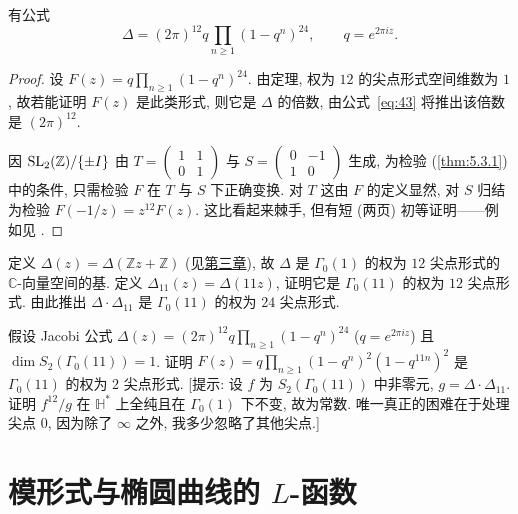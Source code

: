 \begin{theorem}[Jacobi] \label{thm:5.3.7} 
有公式
\[
\Delta = (2\pi)^{12}q\prod_{n\ge 1}(1-q^n)^{24}, \qquad q = e^{2\pi iz}.
\]
\end{theorem}

\begin{proof}
设 $F(z) = q\prod_{n\ge 1}(1-q^n)^{24}$. 由定理, 权为 $12$ 的尖点形式空间维数为 $1$, 故若能证明 $F(z)$ 是此类形式, 则它是 $\Delta$ 的倍数, 由公式~\eqref{eq:43} 将推出该倍数是 $(2\pi)^{12}$.

因 $\operatorname{SL}_2(\mathbb{Z})/\{\pm I\}$ 由 $T = \begin{pmatrix}1 & 1\\ 0 & 1\end{pmatrix}$ 与 $S = \begin{pmatrix}0 & -1\\ 1 & 0\end{pmatrix}$ 生成, 为检验 (\ref{thm:5.3.1}) 中的条件, 只需检验 $F$ 在 $T$ 与 $S$ 下正确变换. 对 $T$ 这由 $F$ 的定义显然, 对 $S$ 归结为检验 $F(-1/z) = z^{12}F(z)$. 这比看起来棘手, 但有短 (两页) 初等证明——例如见 \cite[VII, 4.4]{serre1973}.
\end{proof}

\begin{exercise} \label{thm:5.3.8} 
定义 $\Delta(z) = \Delta(\mathbb{Z}z + \mathbb{Z})$ (见\hyperref[ch:3]{第三章}), 故 $\Delta$ 是 $\Gamma_0(1)$ 的权为 $12$ 尖点形式的 $\mathbb{C}$-向量空间的基. 定义 $\Delta_{11}(z) = \Delta(11z)$, 证明它是 $\Gamma_0(11)$ 的权为 $12$ 尖点形式. 由此推出 $\Delta\cdot\Delta_{11}$ 是 $\Gamma_0(11)$ 的权为 $24$ 尖点形式.
\end{exercise}

\begin{exercise} \label{thm:5.3.9} 
假设 Jacobi 公式 $\Delta(z) = (2\pi)^{12}q\prod_{n\ge 1}(1-q^n)^{24}$ ($q = e^{2\pi iz}$) 且 $\dim S_2(\Gamma_0(11)) = 1$. 证明 $F(z) = q\prod_{n\ge 1}(1-q^n)^2(1-q^{11n})^2$ 是 $\Gamma_0(11)$ 的权为 $2$ 尖点形式. [提示: 设 $f$ 为 $S_2(\Gamma_0(11))$ 中非零元, $g = \Delta\cdot\Delta_{11}$. 证明 $f^{12}/g$ 在 $\mathbb{H}^*$ 上全纯且在 $\Gamma_0(1)$ 下不变, 故为常数. 唯一真正的困难在于处理尖点 $0$, 因为除了 $\infty$ 之外, 我多少忽略了其他尖点.]
\end{exercise}

\section{\texorpdfstring{模形式与椭圆曲线的 $L$-函数}{模形式与椭圆曲线的 L-函数}}\label{sec:5.4}

